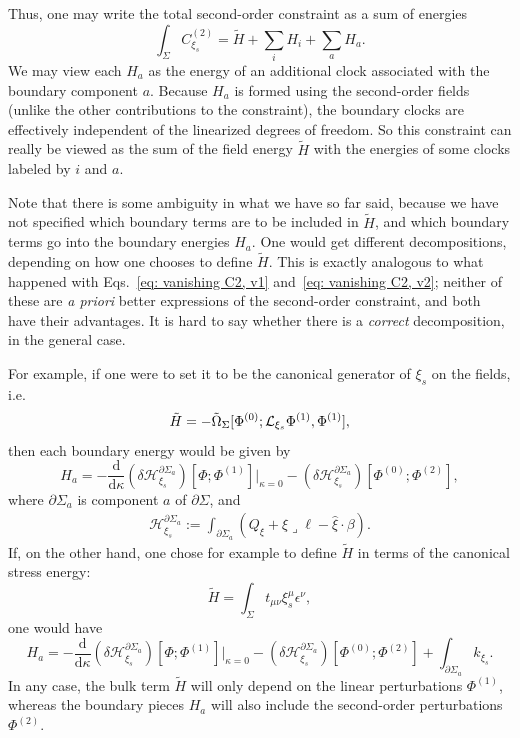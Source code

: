 \documentclass[]{jkpaper}
\theoremstyle{plain}
\theoremstyle{definition}
\newcommand{\sins}{\mathop{\lrcorner}}
\newcommand{\fins}{\cdot}
\newcommand{\sd}{\mathrm {d}}
\newcommand{\fd}{\delta}
\begin{document}
Thus, one may write the total second-order constraint as a sum of energies
\begin{equation}
    \int_\Sigma C_{\xi_s}^{(2)} = \tilde{H} + \sum_i H_i + \sum_a H_a.
    \label{eq: energy decomposition}
\end{equation}
We may view each $H_a$ as the energy of an additional clock associated with the boundary component $a$. Because $H_a$ is formed using the second-order fields (unlike the other contributions to the constraint), the boundary clocks are effectively independent of the linearized degrees of freedom. So this constraint can really be viewed as the sum of the field energy $\tilde{H}$ with the energies of some clocks labeled by $i$ and $a$.

Note that there is some ambiguity in what we have so far said, because we have not specified which boundary terms are to be included in $\tilde{H}$, and which boundary terms go into the boundary energies $H_a$. One would get different decompositions, depending on how one chooses to define $\tilde{H}$. This is exactly analogous to what happened with Eqs.~\eqref{eq: vanishing C2, v1} and~\eqref{eq: vanishing C2, v2}; neither of these are \emph{a priori} better expressions of the second-order constraint, and both have their advantages. It is hard to say whether there is a \emph{correct} decomposition, in the general case.

For example, if one were to set it to be the canonical generator of $\xi_s$ on the fields, i.e.
\begin{equation}
    \tilde{H} = -\tilde\Omega_\Sigma[\Phi^{(0)};\mathcal{L}_{\xi_s}\Phi^{(1)},\Phi^{(1)}],
\end{equation}
then each boundary energy would be given by
\begin{equation}
    H_a = -\frac{\sd}{\sd\kappa}(\fd \mathcal{H}^{\partial\Sigma_a}_{\xi_s})[\Phi;\Phi^{(1)}]|_{\kappa=0}
    -(\fd \mathcal{H}^{\partial\Sigma_a}_{\xi_s})[\Phi^{(0)};\Phi^{(2)}],
\end{equation}
where $\partial\Sigma_a$ is component $a$ of $\partial\Sigma$, and 
\begin{equation}\begin{split}\label{eq: full charge one boundary component}
    \mathcal{H}^{\partial\Sigma_a}_{\xi_s} :=\int_{\partial \Sigma_a}\left(Q_\xi+\xi\sins\ell-\hat{\xi}\fins\beta\right).
\end{split}\end{equation}
If, on the other hand, one chose for example to define $\tilde{H}$ in terms of the canonical stress energy:
\begin{equation}
    \tilde{H} = \int_\Sigma t_{\mu\nu}\xi_s^\mu \epsilon^\nu,
\end{equation}
one would have 
\begin{equation}
    H_a = -\frac{\sd}{\sd\kappa}(\fd \mathcal{H}^{\partial\Sigma_a}_{\xi_s})[\Phi;\Phi^{(1)}]|_{\kappa=0}
    -(\fd \mathcal{H}^{\partial\Sigma_a}_{\xi_s})[\Phi^{(0)};\Phi^{(2)}] + \int_{\partial\Sigma_a}k_{\xi_s}.
\end{equation}
In any case, the bulk term $\tilde H$ will only depend on the linear perturbations $\Phi^{(1)}$, whereas the boundary pieces $H_a$ will also include the second-order perturbations $\Phi^{(2)}$.
\end{document}
